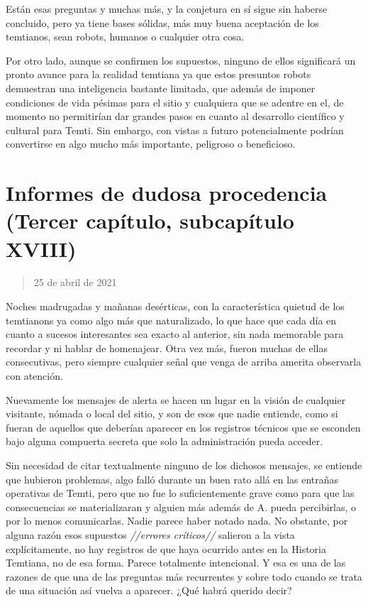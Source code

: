 \documentclass[
  spanish,
]{book}
\begin{document}
Están esas preguntas y muchas más, y la conjetura en sí sigue sin haberse concluido, pero ya tiene bases sólidas, más muy buena aceptación de los temtianos, sean robots, humanos o cualquier otra cosa.

Por otro lado, aunque se confirmen los supuestos, ninguno de ellos significará un pronto avance para la realidad temtiana ya que estos presuntos robots demuestran una inteligencia bastante limitada, que además de imponer condiciones de vida pésimas para el sitio y cualquiera que se adentre en el, de momento no permitirían dar grandes pasos en cuanto al desarrollo científico y cultural para Temti. Sin embargo, con vistas a futuro potencialmente podrían convertirse en algo mucho más importante, peligroso o beneficioso.

\hypertarget{informes-de-dudosa-procedencia-tercer-capuxedtulo-subcapuxedtulo-xviii}{%
\section{Informes de dudosa procedencia (Tercer capítulo, subcapítulo XVIII)}\label{informes-de-dudosa-procedencia-tercer-capuxedtulo-subcapuxedtulo-xviii}}

\begin{quote}
25 de abril de 2021
\end{quote}

Noches madrugadas y mañanas desérticas, con la característica quietud de los temtianons ya como algo más que naturalizado, lo que hace que cada día en cuanto a sucesos interesantes sea exacto al anterior, sin nada memorable para recordar y ni hablar de homenajear. Otra vez más, fueron muchas de ellas consecutivas, pero siempre cualquier señal que venga de arriba amerita observarla con atención.

Nuevamente los mensajes de alerta se hacen un lugar en la visión de cualquier visitante, nómada o local del sitio, y son de esos que nadie entiende, como si fueran de aquellos que deberían aparecer en los registros técnicos que se esconden bajo alguna compuerta secreta que solo la administración pueda acceder.

Sin necesidad de citar textualmente ninguno de los dichosos mensajes, se entiende que hubieron problemas, algo falló durante un buen rato allá en las entrañas operativas de Temti, pero que no fue lo suficientemente grave como para que las consecuencias se materializaran y alguien más además de A. pueda percibirlas, o por lo menos comunicarlas. Nadie parece haber notado nada. No obstante, por alguna razón esos supuestos \emph{//errores críticos//} salieron a la vista explícitamente, no hay registros de que haya ocurrido antes en la Historia Temtiana, no de esa forma. Parece totalmente intencional. Y esa es una de las razones de que una de las preguntas más recurrentes y sobre todo cuando se trata de una situación así vuelva a aparecer. ¿Qué habrá querido decir?
\end{document}
